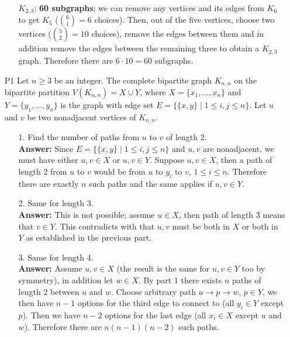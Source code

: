\documentclass{article}
\begin{document}
\begin{itemize}
\begin{itemize}
              \item [$K_{2,3}$:] \textbf{60 subgraphs}; we can remove any vertices and its edges from $K_6$ to get $K_5$ (${6\choose 1}=6$ choices). Then, out of the five vertices, choose two vertices (${5\choose 2}=10$ choices), remove the edges between them and in addition remove the edges between the remaining three to obtain a $K_{2,3}$ graph. Therefore there are $6\cdot 10=60$ subgraphs.
          \end{itemize}
    \item [P1] Let $n\geq 3$ be an integer. The complete bipartite graph $K_{n,n}$ on the bipartite partition $V(K_{n,n})=X\cup Y$, where $X=\{x_1,\ldots,x_n\}$ and $Y=\{y_1,\ldots,y_n\}$ is the graph with edge set $E=\{\{x,y\}\mid 1\leq i,j\leq n\}$. Let $u$ and $v$ be two nonadjacent vertices of $K_{n,n}$.
          \begin{itemize}
              \item [1.] Find the number of paths from $u$ to $v$ of length 2.\\\textbf{Answer: } Since $E=\{\{x,y\}\mid 1\leq i,j\leq n\}$ and $u,v$ are nonadjacent, we must have either $u,v\in X$ or $u,v\in Y$. Suppose $u,v\in X$, then a path of length 2 from $u$ to $v$ would be from $u$ to $y_i$ to $v$, $1\leq i\leq n$. Therefore there are exactly $n$ such paths and the same applies if $u,v\in Y$.
              \item [2.] Same for length 3.\\\textbf{Answer: } This is not possible; assume $u\in X$, then path of length 3 means that $v\in Y$. This contradicts with that $u,v$ must be both in $X$ or both in $Y$ as established in the previous part.
              \item [3.] Same for length 4.\\\textbf{Answer: } Assume $u,v\in X$ (the result is the same for $u,v\in Y$ too by symmetry), in addition let $w\in X$. By part 1 there exists $n$ paths of length 2 between $u$ and $w$. Choose arbitrary path $u\rightarrow p\rightarrow w$, $p\in Y$, we then have $n-1$ options for the third edge to connect to (all $y_i\in Y$ except $p$). Then we have $n-2$ options for the last edge (all $x_i\in X$ except $u$ and $w$). Therefore there are $n(n-1)(n-2)$ such paths.

\end{itemize}
\end{itemize}
\end{document}

